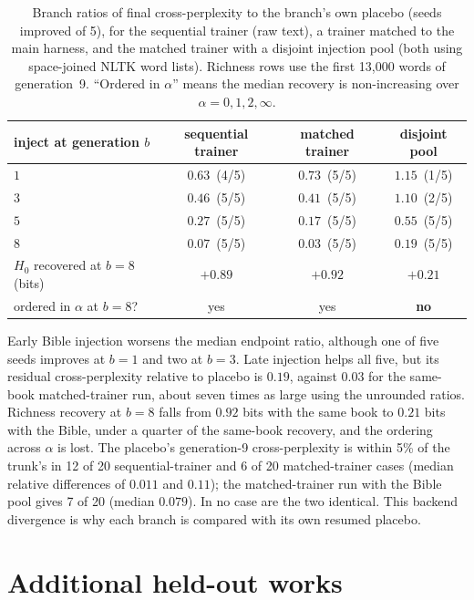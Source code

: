 \documentclass[10pt]{article}
\theoremstyle{plain}
\theoremstyle{definition}
\newcommand{\Hz}{H_0}
\begin{document}
\begin{table}[ht]
\centering\small
\caption{Branch ratios of final cross-perplexity to the branch's own placebo (seeds improved of
5), for the sequential trainer (raw text), a trainer matched to the main harness, and the
matched trainer with a disjoint injection pool (both using space-joined NLTK word lists).
Richness rows use the first 13,000 words of generation~9. ``Ordered in $\alpha$'' means the
median recovery is non-increasing over $\alpha=0,1,2,\infty$.}
\label{tab:branchpool}
\begin{tabular}{lccc}
\toprule
inject at generation $b$ & sequential trainer & matched trainer & \textbf{disjoint pool} \\
\midrule
$1$ & $0.63$ \,(4/5) & $0.73$ \,(5/5) & $\mathbf{1.15}$ \,(1/5) \\
$3$ & $0.46$ \,(5/5) & $0.41$ \,(5/5) & $\mathbf{1.10}$ \,(2/5) \\
$5$ & $0.27$ \,(5/5) & $0.17$ \,(5/5) & $0.55$ \,(5/5) \\
$8$ & $0.07$ \,(5/5) & $0.03$ \,(5/5) & $0.19$ \,(5/5) \\
\midrule
$\Hz$ recovered at $b{=}8$ (bits) & $+0.89$ & $+0.92$ & $+0.21$ \\
ordered in $\alpha$ at $b{=}8$? & yes & yes & \textbf{no} \\
\bottomrule
\end{tabular}
\end{table}

Early Bible injection worsens the median endpoint ratio, although one of five seeds improves at
$b=1$ and two at $b=3$. Late injection helps all five, but its residual cross-perplexity relative
to placebo is $0.19$, against $0.03$ for the same-book matched-trainer run, about seven times as large using the unrounded ratios. Richness recovery at $b=8$ falls
from $0.92$ bits with the same book to $0.21$ bits with the Bible, under a quarter of the
same-book recovery, and the ordering across $\alpha$ is lost. The placebo's generation-9 cross-perplexity is within 5\% of the trunk's in 12 of 20 sequential-trainer
and 6 of 20 matched-trainer cases (median relative differences of $0.011$ and $0.11$); the matched-trainer run with the Bible pool gives 7 of 20
(median $0.079$). In no case are the two identical. This backend divergence is why each branch is compared with its
own resumed placebo.

\section{Additional held-out works}
\label{app:multiwork}
\end{document}
